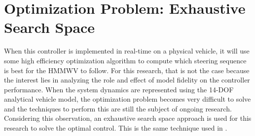 \documentclass[12pt,onecolumn]{report}
\begin{document}
\section{Optimization Problem: Exhaustive Search Space}\label{s:Optimization}

When this controller is implemented in real-time on a physical vehicle, it will use some high efficiency optimization algorithm to compute which steering sequence is best for the HMMWV to follow. For this research, that is not the case because the interest lies in analyzing the role and effect of model fidelity on the controller performance. When the system dynamics are represented using the 14-DOF analytical vehicle model, the optimization problem becomes very difficult to solve and the techniques to perform this are still the subject of ongoing research. Considering this observation, an exhaustive search space approach is used for this research to solve the optimal control. This is the same technique used in \cite{ModelFidelity2016}. 
\end{document}
